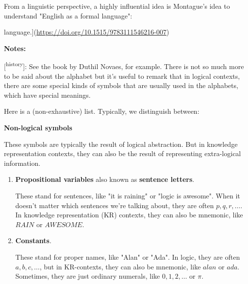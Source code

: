 \documentclass[11pt]{article}
\begin{document}
From a linguistic perspective, a highly influential idea is Montague's idea to
understand "English as a formal language":

\begin{itemize}
\item{}(\url{https://doi.org/10.1515/9783111546216-007})

\textbf{\textbf{Notes:}}

[\textsuperscript{history}]: See the book by Duthil Novaes, for example.
There is not so much more to be said about the alphabet but it's useful to
remark that in logical contexts, there are some special kinds of symbols that
are usually used in the alphabets, which have special meanings.

Here is a (non-exhaustive) list. Typically, we distinguish between:

\textbf{\textbf{Non-logical symbols}}

These symbols are typically the result of logical abstraction. But in knowledge
representation contexts, they can also be the result of representing
extra-logical information.

\begin{enumerate}
\item \textbf{\textbf{Propositional variables}} also known as \textbf{\textbf{sentence letters}}. 

These stand for sentences, like "it is raining" or "logic is awesome". When
it doesn't matter which sentences we're talking about, they are often
\(p,q,r,\dots\). In knowledge representation (KR) contexts, they can also be
mnemonic, like \(RAIN\) or \(AWESOME\).

\item \textbf{\textbf{Constants}}. 

These stand for proper names, like "Alan" or "Ada". In logic, they are often
\(a,b,c,\dots\), but in KR-contexts, they can also be mnemonic, like \(alan\) or
\(ada\). Sometimes, they are just ordinary numerals, like \(0,1,2,\dots\) or
\(\pi\).
\end{enumerate}
\end{document}
